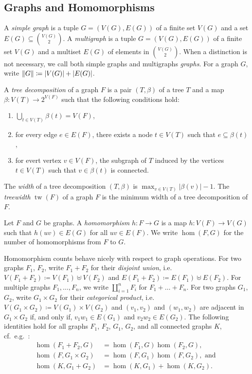 \documentclass[10pt,a4paper]{article}
\theoremstyle{definition}
\theoremstyle{plain}
\theoremstyle{remark}
\DeclarePairedDelimiter{\norm}{\lVert}{\rVert}
\DeclarePairedDelimiter{\abs}{\lvert}{\rvert}
\DeclareMathOperator{\tw}{tw}
\begin{document}
	\subsection{Graphs and Homomorphisms}

A \emph{simple graph} is a tuple $G = (V(G), E(G))$ of a finite set $V(G)$ and a set $E(G) \subseteq \binom{V(G)}{2}$.
A \emph{multigraph} is a tuple $G = (V(G), E(G))$ of a finite set $V(G)$ and a multiset $E(G)$ of elements in $\binom{V(G)}{2}$. 
When a distinction is not necessary, we call both simple graphs and multigraphs \emph{graphs}.
For a graph $G$, write $\norm{G} \coloneqq \abs{V(G)} + \abs{E(G)}$.

A \emph{tree decomposition} of a graph $F$ is a pair $(T, \beta)$ of a tree $T$ and a map $\beta \colon V(T) \to 2^{V(F)}$ such that the following conditions hold:
\begin{enumerate}
	\item $\bigcup_{t \in V(T)} \beta(t) = V(F)$,
	\item for every edge $e \in E(F)$, there exists a node $t \in V(T)$ such that $e \subseteq \beta(t)$,
	\item for evert vertex $v \in V(F)$, the subgraph of $T$ induced by the vertices $t \in V(T)$ such that $v\in \beta(t)$ is connected.
\end{enumerate}
The \emph{width} of a tree decomposition $(T, \beta)$ is $\max_{v \in V(T)} |\beta(v)| -1$. 
The \emph{treewidth} $\tw(F)$ of a graph $F$ is the minimum width of a tree decomposition of $F$.

Let $F$ and $G$ be graphs.
A \emph{homomorphism} $h \colon F\to G$ is a map $h \colon V(F) \to V(G)$ such that $h(uv) \in E(G)$ for all $uv \in E(F)$.
We write $\hom(F, G)$ for the number of homomorphisms from $F$ to $G$.

Homomorphism counts behave nicely with respect to graph operations.
For two graphs $F_1$, $F_2$, write $F_1 + F_2$ for their \emph{disjoint union}, i.e.\ $V(F_1 + F_2) \coloneqq V(F_1) \uplus V(F_2)$ and $E(F_1 + F_2) \coloneqq E(F_1) \uplus E(F_2)$.
For multiple graphs $F_1, \dots, F_n$, we write $\coprod_{i=1}^n F_i$ for $F_1 + \dots + F_n$.
For two graphs $G_1$, $G_2$, write $G_1 \times G_2$ for their \emph{categorical product}, i.e.\ $V(G_1 \times G_2) \coloneqq V(G_1) \times V(G_2)$ and $(v_1, v_2)$ and $(w_1, w_2)$ are adjacent in $G_1 \times G_2$ if, and only if, $v_1w_1 \in E(G_1)$ and $v_2w_2 \in E(G_2)$.
The following identities hold for all graphs $F_1$, $F_2$, $G_1$, $G_2$, and all connected graphs $K$, cf.\ e.g.\ \cite[(5.28)--(5.30)]{lovasz_large_2012}:
\begin{align}
	\hom(F_1 + F_2, G) &= \hom(F_1, G) \hom(F_2, G), \label{eq:coproduct} \\
	\hom(F, G_1 \times G_2) &= \hom(F, G_1) \hom(F, G_2), \text{ and }\label{eq:product} \\
	\hom(K, G_1 + G_2) &= \hom(K, G_1) + \hom(K, G_2). \label{eq:disjoint}
\end{align}
\end{document}
